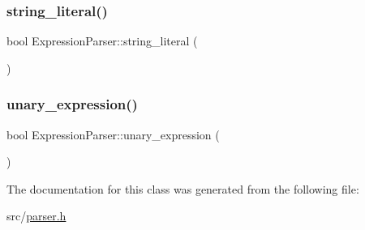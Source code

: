 \mbox{\label{class_expression_parser_a7595a47d989cc56d4e3decd5c126dde3}} 
\subsubsection{\texorpdfstring{string\+\_\+literal()}{string\_literal()}}
{\footnotesize\ttfamily bool Expression\+Parser\+::string\+\_\+literal (\begin{DoxyParamCaption}{ }\end{DoxyParamCaption})\hspace{0.3cm}{\ttfamily [inline]}}

\mbox{\label{class_expression_parser_a0e2bc482f634c7d82d56aaea65e84e83}} 
\subsubsection{\texorpdfstring{unary\+\_\+expression()}{unary\_expression()}}
{\footnotesize\ttfamily bool Expression\+Parser\+::unary\+\_\+expression (\begin{DoxyParamCaption}{ }\end{DoxyParamCaption})\hspace{0.3cm}{\ttfamily [inline]}}



The documentation for this class was generated from the following file\+:\begin{DoxyCompactItemize}
\item 
src/\hyperlink{parser_8h}{parser.\+h}\end{DoxyCompactItemize}

